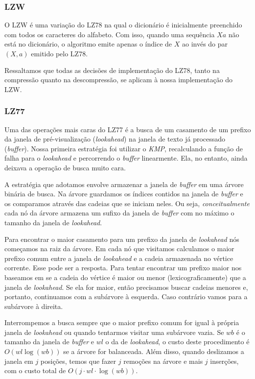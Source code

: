 \documentclass[]{article}
\begin{document}
\subsubsection{LZW}

O LZW é uma variação do LZ78 na qual o dicionário é inicialmente preenchido com todos os caracteres do alfabeto. Com isso, quando uma sequência $Xa$ não está no dicionário, o algoritmo emite apenas o índice de $X$ ao invés do par $(X,a)$ emitido pelo LZ78.

Ressaltamos que todas as decisões de implementação do LZ78, tanto na compressão quanto na descompressão, se aplicam à nossa implementação do LZW.

\subsubsection{LZ77}

Uma das operações mais caras do LZ77 é a busca de um casamento de um prefixo da janela de pré-visualização (\textit{lookahead}) na janela de texto já processado (\textit{buffer}). Nossa primeira estratégia foi utilizar o \textit{KMP}, recalculando a função de falha para o \textit{lookahead} e percorrendo o \textit{buffer} linearmente. Ela, no entanto, ainda deixava a operação de busca muito cara.

A estratégia que adotamos envolve armazenar a janela de \textit{buffer} em uma árvore binária de busca. Na árvore guardamos os índices contidos na janela de \textit{buffer} e os comparamos através das cadeias que se iniciam neles. Ou seja, \textit{conceitualmente} cada nó da árvore armazena um sufixo da janela de \textit{buffer} com no máximo o tamanho da janela de \textit{lookahead}. 

Para encontrar o maior casamento para um prefixo da janela de \textit{lookahead} nós começamos na raiz da árvore. Em cada nó que visitamos calculamos o maior prefixo comum entre a janela de \textit{lookahead} e a cadeia armazenada no vértice corrente. Esse pode ser a resposta. Para tentar encontrar um prefixo maior nos baseamos em se a cadeia do vértice é maior ou menor (lexicograficamente) que a janela de \textit{lookahead}. Se ela for maior, então precisamos buscar cadeias menores e, portanto, continuamos com a subárvore à esquerda. Caso contrário vamos para a subárvore à direita.

Interrompemos a busca sempre que o maior prefixo comum for igual à própria janela de \textit{lookahead} ou quando tentarmos visitar uma subárvore vazia. Se $wb$ é o tamanho da janela de \textit{buffer} e $wl$ o da de \textit{lookahead}, o custo deste procedimento é $O(wl\log(wb))$ se a árvore for balanceada. Além disso, quando deslizamos a janela em $j$ posições, temos que fazer $j$ remoções na árvore e mais $j$ inserções, com o custo total de $O(j\cdot wl\cdot \log(wb))$.
\end{document}
